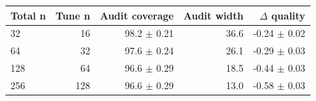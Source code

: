 \begin{tabular}{lrrrr}
\toprule
Total n & Tune n & Audit coverage & Audit width & $\Delta$ quality \\
\midrule
32 & 16 & 98.2 $\pm$ 0.21 & 36.6 & -0.24 $\pm$ 0.02 \\
64 & 32 & 97.6 $\pm$ 0.24 & 26.1 & -0.29 $\pm$ 0.03 \\
128 & 64 & 96.6 $\pm$ 0.29 & 18.5 & -0.44 $\pm$ 0.03 \\
256 & 128 & 96.6 $\pm$ 0.29 & 13.0 & -0.58 $\pm$ 0.03 \\
\bottomrule
\end{tabular}
